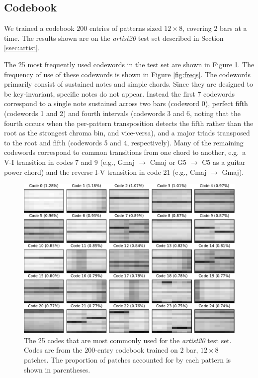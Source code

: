 \documentclass{article}
\newcommand{\eg}{e.g.~}
\begin{document}
\subsection{Codebook}\label{sec:codebook}

We trained a codebook $200$ entries of patterns sized $12\times8$, covering
$2$ bars at a time.  The results shown are on the {\it artist20} test set described in 
Section \ref{ssec:artist}.


The 25 most frequently used codewords in the test set are shown in
Figure \ref{fig:codes1}.  
The frequency of use of these codewords is shown in Figure \ref{fig:freqs}.
The codewords primarily consist of sustained
notes and simple chords.  Since they are designed to be key-invariant,
specific notes do not appear.  Instead the first 7 codewords
correspond to a single note sustained across two bars (codeword 0),
perfect fifth (codewords 1 and 2) and fourth intervals (codewords 3
and 6, noting that the fourth occurs when the per-pattern transposition 
detects the fifth rather than the root as the strongest chroma bin, and vice-versa), and a
major triads transposed to the root and fifth (codewords 5 and 4, respectively).  Many of the remaining
codewords correspond to common transitions from one chord to another,
\eg a V-I transition in codes 7 and 9
(e.g., Gmaj
$\rightarrow$ Cmaj or G5 $\rightarrow$ C5 as a guitar power chord)
and the reverse I-V transition in code 21 (e.g., Cmaj
$\rightarrow$ Gmaj).

\begin{figure}[t]
\begin{center}
\includegraphics[width=.9\columnwidth]{codes1}
\end{center}
\caption{\small{
The 25 codes that are 
most commonly used for the {\it artist20} test set. 
Codes are from the $200$-entry codebook trained on $2$ bar, $12 \times 8$
patches.  The proportion of patches accounted for by each pattern is shown 
in parentheses.
}}
\label{fig:codes1}
\end{figure}
\end{document}
